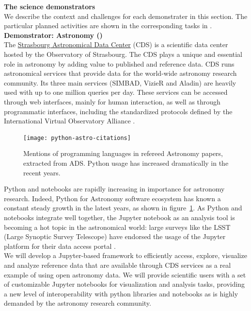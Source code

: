 \medskip
\noindent
\textbf{The science
  demonstrators}\label{sec:science-demonstrators-in-concept}\\

We describe the context and challenges for each demonstrater in this
section. The particular planned activities are shown in the
corresponding tasks in .\\

\noindent\textbf{Demonstrator: Astronomy ()}\label{sec:concept-demonstrator-astronomy}\\
  The \href{http://cdsweb.u-strasbg.fr/}{Strasbourg Astronomical Data Center} (CDS) is a scientific data
  center hosted by the Observatory of Strasbourg. The CDS plays a unique and
  essential role in astronomy by adding value to published and reference data.
  CDS runs astronomical services that
  provide data for the world-wide astronomy research community. Its three main
  services (SIMBAD, VizieR and Aladin) are heavily used with up to one million
  queries per day.  These services can be accessed through web interfaces, mainly
  for human interaction, as well as through programmatic interfaces, including
  the standardized protocols defined by the International Virtual Observatory
  Alliance \cite{ivoa}.

\begin{figure}[ht!]\centering
  \texttt{[image: python-astro-citations]}
  \caption{Mentions of programming languages in refereed Astronomy papers, extracted from ADS. Python usage has increased dramatically in the recent years.}\label{fig:python-astro-citations}
\end{figure}

  Python and notebooks are rapidly increasing in importance for astronomy
  research. Indeed, Python for Astronomy software ecosystem has known a
  constant steady growth in the latest years, as shown in
  figure~\ref{fig:python-astro-citations}. As Python and notebooks integrate
  well together, the Jupyter notebook as an analysis tool is becoming a hot
  topic in the astronomical world: large surveys like the LSST (Large Synoptic
  Survey Telescope) have endorsed the usage of the Jupyter platform for their
    data access portal \cite{lsst2017scienceplatform}.\\


  We will develop a Jupyter-based framework to efficiently access, explore,
  visualize and analyze reference data that are available through CDS services
  as a real example of using open astronomy data.
  We will provide scientific users with a set of customizable Jupyter notebooks
  for visualization and analysis tasks, providing a new level of
  interoperability with python libraries and notebooks as is highly demanded
  by the astronomy research community.

